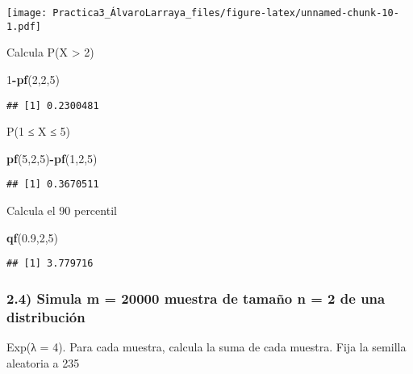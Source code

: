 \documentclass[
]{article}
\newenvironment{Shaded}{\begin{snugshade}}{\end{snugshade}}
\newcommand{\DecValTok}[1]{\textcolor[rgb]{0.00,0.00,0.81}{#1}}
\newcommand{\FloatTok}[1]{\textcolor[rgb]{0.00,0.00,0.81}{#1}}
\newcommand{\KeywordTok}[1]{\textcolor[rgb]{0.13,0.29,0.53}{\textbf{#1}}}
\newcommand{\NormalTok}[1]{#1}
\newcommand{\OperatorTok}[1]{\textcolor[rgb]{0.81,0.36,0.00}{\textbf{#1}}}
\begin{document}
\texttt{[image: Practica3\_ÁlvaroLarraya\_files/figure-latex/unnamed-chunk-10-1.pdf]}

Calcula P(X \textgreater{} 2)

\begin{Shaded}
\begin{Highlighting}[]
\DecValTok{1}\OperatorTok{-}\KeywordTok{pf}\NormalTok{(}\DecValTok{2}\NormalTok{,}\DecValTok{2}\NormalTok{,}\DecValTok{5}\NormalTok{)}
\end{Highlighting}
\end{Shaded}

\begin{verbatim}
## [1] 0.2300481
\end{verbatim}

P(1 ≤ X ≤ 5)

\begin{Shaded}
\begin{Highlighting}[]
\KeywordTok{pf}\NormalTok{(}\DecValTok{5}\NormalTok{,}\DecValTok{2}\NormalTok{,}\DecValTok{5}\NormalTok{)}\OperatorTok{-}\KeywordTok{pf}\NormalTok{(}\DecValTok{1}\NormalTok{,}\DecValTok{2}\NormalTok{,}\DecValTok{5}\NormalTok{)}
\end{Highlighting}
\end{Shaded}

\begin{verbatim}
## [1] 0.3670511
\end{verbatim}

Calcula el 90 percentil

\begin{Shaded}
\begin{Highlighting}[]
\KeywordTok{qf}\NormalTok{(}\FloatTok{0.9}\NormalTok{,}\DecValTok{2}\NormalTok{,}\DecValTok{5}\NormalTok{)}
\end{Highlighting}
\end{Shaded}

\begin{verbatim}
## [1] 3.779716
\end{verbatim}

\hypertarget{simula-m-20000-muestra-de-tamauxf1o-n-2-de-una-distribuciuxf3n}{%
\subsubsection{2.4) Simula m = 20000 muestra de tamaño n = 2 de una
distribución}\label{simula-m-20000-muestra-de-tamauxf1o-n-2-de-una-distribuciuxf3n}}

Exp(λ = 4). Para cada muestra, calcula la suma de cada muestra. Fija la
semilla aleatoria a 235
\end{document}
